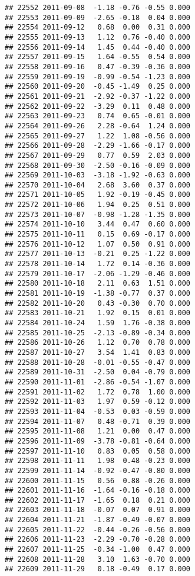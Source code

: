 \documentclass[
]{article}
\begin{document}
\begin{verbatim}
## 22552 2011-09-08  -1.18 -0.76 -0.55 0.000
## 22553 2011-09-09  -2.65 -0.18  0.04 0.000
## 22554 2011-09-12   0.68  0.00  0.31 0.000
## 22555 2011-09-13   1.12  0.76 -0.40 0.000
## 22556 2011-09-14   1.45  0.44 -0.40 0.000
## 22557 2011-09-15   1.64 -0.55  0.54 0.000
## 22558 2011-09-16   0.47 -0.39 -0.36 0.000
## 22559 2011-09-19  -0.99 -0.54 -1.23 0.000
## 22560 2011-09-20  -0.45 -1.49  0.25 0.000
## 22561 2011-09-21  -2.92 -0.37 -1.22 0.000
## 22562 2011-09-22  -3.29  0.11  0.48 0.000
## 22563 2011-09-23   0.74  0.65 -0.01 0.000
## 22564 2011-09-26   2.28 -0.64  1.24 0.000
## 22565 2011-09-27   1.22  1.08 -0.56 0.000
## 22566 2011-09-28  -2.29 -1.66 -0.17 0.000
## 22567 2011-09-29   0.77  0.59  2.03 0.000
## 22568 2011-09-30  -2.50 -0.16 -0.09 0.000
## 22569 2011-10-03  -3.18 -1.92 -0.63 0.000
## 22570 2011-10-04   2.68  3.60  0.37 0.000
## 22571 2011-10-05   1.92 -0.19 -0.45 0.000
## 22572 2011-10-06   1.94  0.25  0.51 0.000
## 22573 2011-10-07  -0.98 -1.28 -1.35 0.000
## 22574 2011-10-10   3.44  0.47  0.60 0.000
## 22575 2011-10-11   0.15  0.69 -0.17 0.000
## 22576 2011-10-12   1.07  0.50  0.91 0.000
## 22577 2011-10-13  -0.21  0.25 -1.22 0.000
## 22578 2011-10-14   1.72  0.14 -0.36 0.000
## 22579 2011-10-17  -2.06 -1.29 -0.46 0.000
## 22580 2011-10-18   2.11  0.63  1.51 0.000
## 22581 2011-10-19  -1.38 -0.77  0.37 0.000
## 22582 2011-10-20   0.43 -0.30  0.70 0.000
## 22583 2011-10-21   1.92  0.15  0.01 0.000
## 22584 2011-10-24   1.59  1.76 -0.38 0.000
## 22585 2011-10-25  -2.13 -0.89 -0.34 0.000
## 22586 2011-10-26   1.12  0.70  0.78 0.000
## 22587 2011-10-27   3.54  1.41  0.83 0.000
## 22588 2011-10-28  -0.01 -0.55 -0.47 0.000
## 22589 2011-10-31  -2.50  0.04 -0.79 0.000
## 22590 2011-11-01  -2.86 -0.54 -1.07 0.000
## 22591 2011-11-02   1.72  0.78  1.00 0.000
## 22592 2011-11-03   1.97  0.59 -0.12 0.000
## 22593 2011-11-04  -0.53  0.03 -0.59 0.000
## 22594 2011-11-07   0.48 -0.71  0.39 0.000
## 22595 2011-11-08   1.21  0.00  0.47 0.000
## 22596 2011-11-09  -3.78 -0.81 -0.64 0.000
## 22597 2011-11-10   0.83  0.05  0.58 0.000
## 22598 2011-11-11   1.98  0.48 -0.23 0.000
## 22599 2011-11-14  -0.92 -0.47 -0.80 0.000
## 22600 2011-11-15   0.56  0.88 -0.26 0.000
## 22601 2011-11-16  -1.64 -0.16 -0.18 0.000
## 22602 2011-11-17  -1.65  0.18  0.21 0.000
## 22603 2011-11-18  -0.07  0.07  0.91 0.000
## 22604 2011-11-21  -1.87 -0.49 -0.07 0.000
## 22605 2011-11-22  -0.44 -0.26 -0.56 0.000
## 22606 2011-11-23  -2.29 -0.70 -0.28 0.000
## 22607 2011-11-25  -0.34 -1.00  0.47 0.000
## 22608 2011-11-28   3.10  1.63 -0.70 0.000
## 22609 2011-11-29   0.18 -0.49  0.17 0.000

\end{verbatim}
\end{document}
